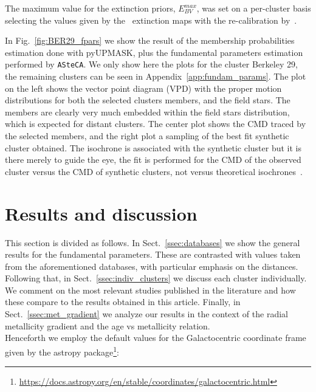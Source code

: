 \documentclass{aa}
\begin{document}
  \noindent The maximum value for the extinction priors, $E_{BV}^{max}$, was set
  on a per-cluster basis selecting the values given by the~\cite{Schlegel_1998}
  extinction maps with the re-calibration by~\cite{Schlafly_2011}.
  
  In Fig.~\ref{fig:BER29_fpars} we show the result of the membership
  probabilities estimation done with pyUPMASK, plus the fundamental parameters
  estimation performed by \texttt{ASteCA}. We only show here the plots for
  the cluster Berkeley 29, the remaining clusters can be seen in
  Appendix~\ref{app:fundam_params}.
  The plot on the left shows the vector point diagram (VPD) with the proper
  motion distributions for both the selected clusters members, and the field
  stars. The members are clearly very much embedded within the field stars
  distribution, which is expected for distant clusters. The center plot shows
  the CMD traced by the selected members, and the right plot a sampling of the
  best fit synthetic cluster obtained. The isochrone is associated with the
  synthetic cluster but it is there merely to guide the eye, the fit is
  performed for the CMD of the observed cluster versus the CMD of synthetic
  clusters, not versus theoretical isochrones~\citep[this is further
  explained in:][]{Perren_2015,Perren_2017,Perren_2020}.\\








\section{Results and discussion}
 \label{sec:results}

 This section is divided as follows.
 In Sect.~\ref{ssec:databases} we show the general results for the
 fundamental parameters. These are contrasted with values taken from the
 aforementioned databases, with particular emphasis on the distances.
 Following that, in Sect.~\ref{ssec:indiv_clusters} we discuss each cluster
 individually. We comment on the most relevant studies published in the
 literature and how these compare to the results obtained in this article.
 Finally, in Sect.~\ref{ssec:met_gradient} we analyze our results in the context
 of the radial metallicity gradient and the age vs metallicity relation.\\

 Henceforth we employ the default values for the Galactocentric coordinate
 frame given by the astropy
 package\footnote{\url{https://docs.astropy.org/en/stable/coordinates/galactocentric.html}}:
\end{document}

